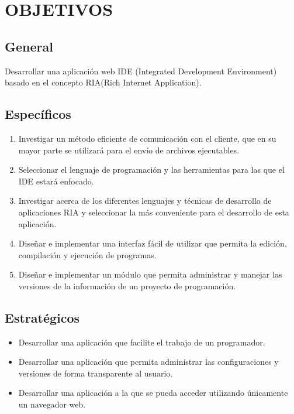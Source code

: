 \section{OBJETIVOS}

\subsection{General}
\label{objetive:general}
Desarrollar una aplicación web IDE (Integrated Development Environment) basado en el concepto RIA(Rich Internet Application).

\subsection{Específicos}

\begin{enumerate}
	
	\item Investigar un método eficiente de comunicación con el cliente, que en su mayor parte se utilizará para el envío de archivos ejecutables.
	
	\item Seleccionar el lenguaje de programación y las herramientas para las que el IDE estará enfocado.
	
	\item Investigar acerca de los diferentes lenguajes y técnicas de desarrollo de aplicaciones RIA y seleccionar la más conveniente para el desarrollo de esta aplicación.
	
	\item Diseñar e implementar una interfaz fácil de utilizar que permita la edición, compilación y ejecución de programas.
	
	\item Diseñar e implementar un módulo que permita administrar y manejar las versiones de la información de un proyecto de programación.
	
\end{enumerate}


\subsection{Estratégicos}

\begin{itemize}

	\item Desarrollar una aplicación que facilite el trabajo de un programador.
	
	\item Desarrollar una aplicación que permita administrar las configuraciones y versiones de forma transparente al usuario.
	
	\item Desarrollar una aplicación a la que se pueda acceder utilizando únicamente un navegador web.
	
\end{itemize}
